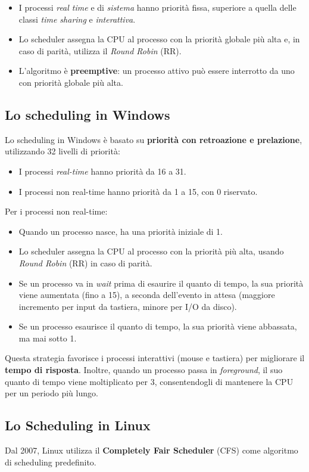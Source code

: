 \begin{itemize}
    \item I processi \textit{real time} e di \textit{sistema} hanno priorità fissa, superiore a quella delle classi \textit{time sharing} e \textit{interattiva}.
    \item Lo scheduler assegna la CPU al processo con la priorità globale più alta e, in caso di parità, utilizza il \textit{Round Robin} (RR).
    \item L'algoritmo è \textbf{preemptive}: un processo attivo può essere interrotto da uno con priorità globale più alta.
\end{itemize}

\subsection{Lo scheduling in Windows}
Lo scheduling in Windows è basato su \textbf{priorità con retroazione e prelazione}, utilizzando 32 livelli di priorità:
\begin{itemize}
    \item I processi \textit{real-time} hanno priorità da 16 a 31.
    \item I processi non real-time hanno priorità da 1 a 15, con 0 riservato.
\end{itemize}

Per i processi non real-time:
\begin{itemize}
    \item Quando un processo nasce, ha una priorità iniziale di 1.
    \item Lo scheduler assegna la CPU al processo con la priorità più alta, usando \textit{Round Robin} (RR) in caso di parità.
    \item Se un processo va in \textit{wait} prima di esaurire il quanto di tempo, la sua priorità viene aumentata (fino a 15), a seconda dell'evento in attesa (maggiore incremento per input da tastiera, minore per I/O da disco).
    \item Se un processo esaurisce il quanto di tempo, la sua priorità viene abbassata, ma mai sotto 1.
\end{itemize}

Questa strategia favorisce i processi interattivi (mouse e tastiera) per migliorare il \textbf{tempo di risposta}. Inoltre, quando un processo passa in \textit{foreground}, il suo quanto di tempo viene moltiplicato per 3, consentendogli di mantenere la CPU per un periodo più lungo.

\subsection{Lo Scheduling in Linux}
Dal 2007, Linux utilizza il \textbf{Completely Fair Scheduler} (CFS) come algoritmo di scheduling predefinito.

